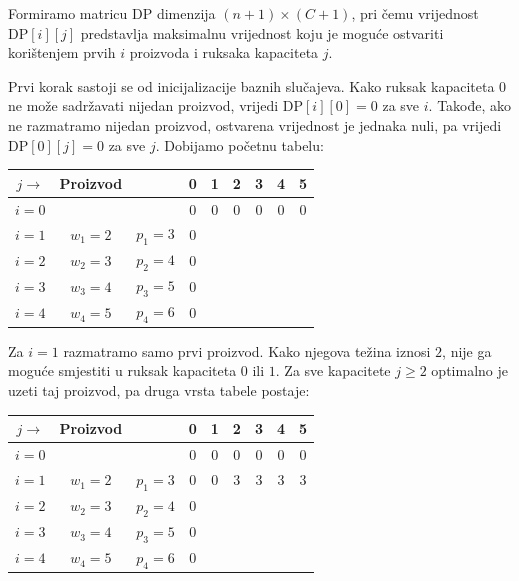 Formiramo matricu $\textrm{DP}$ dimenzija $(n+1)\times(C+1)$, pri čemu vrijednost $\textrm{DP}[i][j]$ predstavlja maksimalnu vrijednost koju je moguće ostvariti korištenjem prvih $i$ proizvoda i ruksaka kapaciteta $j$.

\medskip

Prvi korak sastoji se od inicijalizacije baznih slučajeva. Kako ruksak kapaciteta $0$ ne može sadržavati nijedan proizvod, vrijedi $\textrm{DP}[i][0]=0$ za sve $i$. Takođe, ako ne razmatramo nijedan proizvod, ostvarena vrijednost je jednaka nuli, pa vrijedi $\textrm{DP}[0][j]=0$ za sve $j$. Dobijamo početnu tabelu:

\begin{table}[H]
	\centering
	\begin{tabular}{|c|cc|cccccc|}\hline
		$j\rightarrow$ & Proizvod & & 0 & 1 & 2 & 3 & 4 & 5 \\ \hline
		$i=0$ & & & 0 & 0 & 0 & 0 & 0 & 0 \\
		$i=1$ & $w_1=2$ & $p_1=3$ & 0 & & & & & \\
		$i=2$ & $w_2=3$ & $p_2=4$ & 0 & & & & & \\
		$i=3$ & $w_3=4$ & $p_3=5$ & 0 & & & & & \\
		$i=4$ & $w_4=5$ & $p_4=6$ & 0 & & & & & \\ \hline
	\end{tabular}
\end{table}

\medskip

Za $i=1$ razmatramo samo prvi proizvod. Kako njegova težina iznosi $2$, nije ga moguće smjestiti u ruksak kapaciteta $0$ ili $1$. Za sve kapacitete $j\geq 2$ optimalno je uzeti taj proizvod, pa druga vrsta tabele postaje:

\begin{table}[H]
	\centering
	\begin{tabular}{|c|cc|cccccc|}\hline
		$j\rightarrow$ & Proizvod & & 0 & 1 & 2 & 3 & 4 & 5 \\ \hline
		$i=0$ & & & 0 & 0 & 0 & 0 & 0 & 0 \\
		$i=1$ & $w_1=2$ & $p_1=3$ & 0 & 0 & 3 & 3 & 3 & 3 \\
		$i=2$ & $w_2=3$ & $p_2=4$ & 0 & & & & & \\
		$i=3$ & $w_3=4$ & $p_3=5$ & 0 & & & & & \\
		$i=4$ & $w_4=5$ & $p_4=6$ & 0 & & & & & \\ \hline
	\end{tabular}
\end{table}

